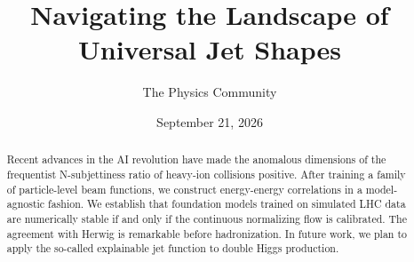 \documentclass[11pt]{article}
\title{Navigating the Landscape of Universal Jet Shapes}
\author{The Physics Community}
\date{September 21, 2026}
\begin{document}
\maketitle
\begin{abstract}
Recent advances in the AI revolution have made the anomalous dimensions
of the frequentist N-subjettiness ratio of heavy-ion collisions
positive. After training a family of particle-level beam functions, we
construct energy-energy correlations in a model-agnostic fashion. We
establish that foundation models trained on simulated LHC data are
numerically stable if and only if the continuous normalizing flow is
calibrated. The agreement with Herwig is remarkable before
hadronization. In future work, we plan to apply the so-called
explainable jet function to double Higgs production.
\end{abstract}
\tableofcontents



\nocite{*}


\end{document}
